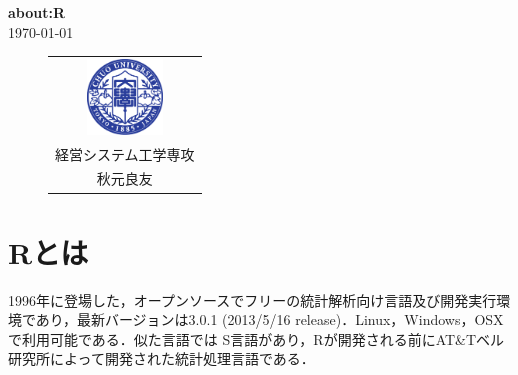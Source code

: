 \documentclass[a4paper,10pt,fleqn]{jarticle}
\begin{document}
\thispagestyle{empty}
\begin{center}
\vspace{3em}
{\bf \Huge{about:R}}
\vspace{1em}\\
\today
\vspace{1.2em}
\end{center}
\begin{indentation}{2.5cm}{2.5cm}
\begin{screen}
\tableofcontents
\end{screen}
\end{indentation}
\vspace{5em}
\begin{figure}[H]
  \begin{center}
    \begin{tabular}{c}
      \begin{minipage}{0.16\hsize}
        \begin{center}
          \includegraphics[width=2cm]{img/chuo.eps}
        \end{center}
      \end{minipage}
      \begin{minipage}{0.29\hsize}
        \begin{center}
          {\bf \large{中央大学理工学研究科\\経営システム工学専攻\\
          \vspace{0.5em}
          秋元良友}}
        \end{center}
      \end{minipage}
    \end{tabular}
  \end{center}
\end{figure}
\newpage
{}
\section{Rとは}
1996年に登場した，オープンソースでフリーの統計解析向け言語及び開発実行環境であり，最新バージョンは3.0.1 (2013/5/16 release)．Linux，Windows，OSX で利用可能である．似た言語では S言語があり，Rが開発される前にAT\&Tベル研究所によって開発された統計処理言語である．
\end{document}
